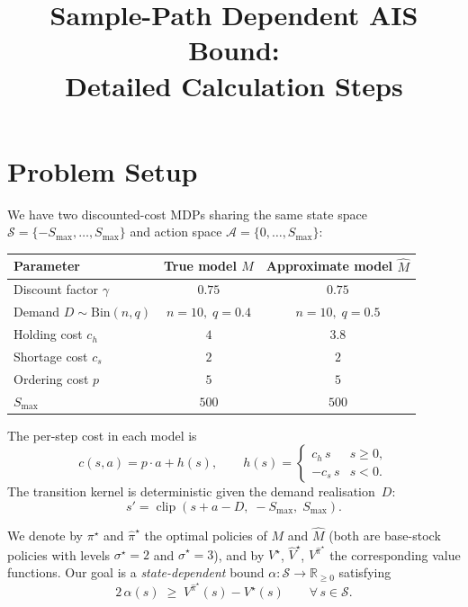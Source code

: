 \documentclass[11pt]{article}
\title{Sample-Path Dependent AIS Bound:\\Detailed Calculation Steps}
\author{}
\date{}
\newcommand{\Smax}{S_{\max}}
\newcommand{\clip}{\operatorname{clip}}
\newcommand{\pistar}{\pi^\star}
\newcommand{\pihatstar}{\hat\pi^\star}
\newcommand{\Vstar}{V^\star}
\newcommand{\Vhatstar}{\hat V^\star}
\newcommand{\Vpihat}{V^{\pihatstar}}
\begin{document}
\maketitle

\section{Problem Setup}

We have two discounted-cost MDPs sharing the same state space
$\mathcal{S} = \{-\Smax, \ldots, \Smax\}$ and action space
$\mathcal{A} = \{0, \ldots, \Smax\}$:
%
\begin{center}
\begin{tabular}{lcc}
\toprule
Parameter & True model $M$ & Approximate model $\hat M$ \\
\midrule
Discount factor $\gamma$ & $0.75$ & $0.75$ \\
Demand $D \sim \mathrm{Bin}(n,q)$ & $n=10,\; q=0.4$ & $n=10,\; q=0.5$ \\
Holding cost $c_h$ & $4$ & $3.8$ \\
Shortage cost $c_s$ & $2$ & $2$ \\
Ordering cost $p$ & $5$ & $5$ \\
$\Smax$ & $500$ & $500$ \\
\bottomrule
\end{tabular}
\end{center}

The per-step cost in each model is
\[
  c(s,a) = p \cdot a + h(s),
  \qquad
  h(s) = \begin{cases} c_h \, s & s \ge 0, \\ -c_s \, s & s < 0. \end{cases}
\]
The transition kernel is deterministic given the demand realisation~$D$:
\[
  s' = \clip(s + a - D,\; -\Smax,\; \Smax).
\]

We denote by $\pistar$ and $\pihatstar$ the optimal policies of $M$ and $\hat M$
(both are base-stock policies with levels $\sigma^\star = 2$ and
$\hat\sigma^\star = 3$), and by $\Vstar$, $\Vhatstar$, $\Vpihat$ the
corresponding value functions.  Our goal is a \emph{state-dependent} bound
$\alpha \colon \mathcal{S} \to \mathbb{R}_{\ge 0}$ satisfying
\begin{equation}\label{eq:goal}
  2\,\alpha(s) \;\ge\; \Vpihat(s) - \Vstar(s) \qquad \forall\, s \in \mathcal{S}.
\end{equation}
\end{document}

